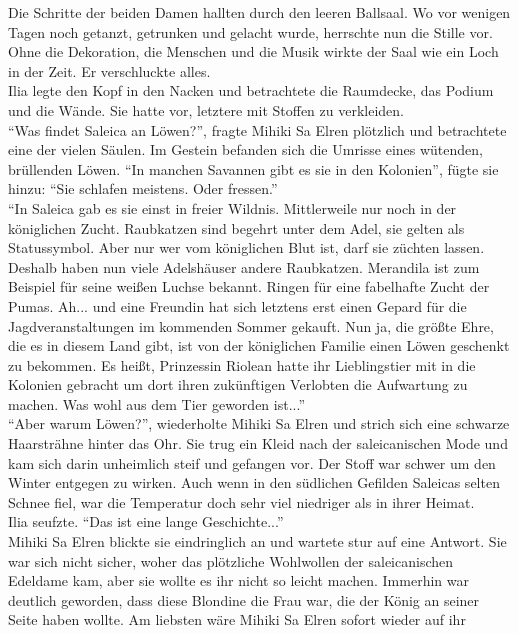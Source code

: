Die Schritte der beiden Damen hallten durch den leeren Ballsaal. Wo vor wenigen Tagen noch getanzt, 
getrunken und gelacht wurde, herrschte nun die Stille vor. Ohne die Dekoration, die Menschen und 
die Musik wirkte der Saal wie ein Loch in der Zeit. Er verschluckte alles.\\
Ilia legte den Kopf in den Nacken und betrachtete die Raumdecke, das Podium und die Wände. Sie 
hatte vor, letztere mit Stoffen zu verkleiden.\\
``Was findet Saleica an Löwen?'', fragte Mihiki Sa Elren plötzlich und betrachtete eine der 
vielen Säulen. Im Gestein befanden sich die Umrisse eines wütenden, brüllenden Löwen. ``In manchen 
Savannen gibt es sie in den Kolonien'', fügte sie hinzu: ``Sie schlafen meistens. Oder fressen.''\\
``In Saleica gab es sie einst in freier Wildnis. Mittlerweile nur noch in der königlichen Zucht. 
Raubkatzen sind begehrt unter dem Adel, sie gelten als Statussymbol. Aber nur wer vom königlichen 
Blut ist, darf sie züchten lassen. Deshalb haben nun viele Adelshäuser andere Raubkatzen. Merandila 
ist zum Beispiel für seine weißen Luchse bekannt. Ringen für eine fabelhafte Zucht der Pumas. Ah... 
und eine Freundin hat sich letztens erst einen Gepard für die Jagdveranstaltungen im kommenden 
Sommer gekauft. Nun ja, die größte Ehre, die es in diesem Land gibt, ist von der königlichen 
Familie einen Löwen geschenkt zu bekommen. Es heißt, Prinzessin Riolean hatte ihr Lieblingstier mit 
in die Kolonien gebracht um dort ihren zukünftigen Verlobten die Aufwartung zu machen. Was wohl aus 
dem Tier geworden ist...''\\
``Aber warum Löwen?'', wiederholte Mihiki Sa Elren und strich sich eine schwarze Haarsträhne hinter 
das Ohr. Sie trug ein Kleid nach der saleicanischen Mode und kam sich darin unheimlich steif und 
gefangen vor. Der Stoff war schwer um den Winter entgegen zu wirken. Auch wenn in den südlichen 
Gefilden Saleicas selten Schnee fiel, war die Temperatur doch sehr viel niedriger als in ihrer 
Heimat.\\
Ilia seufzte. ``Das ist eine lange Geschichte...''\\
Mihiki Sa Elren blickte sie eindringlich an und wartete stur auf eine Antwort. Sie war sich nicht 
sicher, woher das plötzliche Wohlwollen der saleicanischen Edeldame kam, aber sie wollte es ihr 
nicht so leicht machen. Immerhin war deutlich geworden, dass diese Blondine die Frau war, die 
der König an seiner Seite haben wollte. Am liebsten wäre Mihiki Sa Elren sofort wieder auf ihr 
